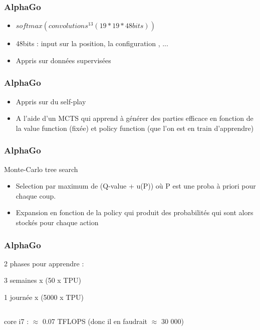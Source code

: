 \documentclass{formation}
\begin{document}
\begin{frame}
  \frametitle{AlphaGo}
  \begin{minipage}[c]{0.50\linewidth}
    \begin{itemize}
    \item $softmax(convolutions^{13}(19*19*48{bits}))$
    \item 48bits : input sur la position, la configuration , ...
    \item Appris sur données supervisées
    \end{itemize}
  \end{minipage}\hfill
  \begin{minipage}[c]{0.49\linewidth}
  \end{minipage}\hfill
\end{frame}

\begin{frame}
  \frametitle{AlphaGo}
  \begin{minipage}[c]{0.50\linewidth}
  \end{minipage}\hfill
  \begin{minipage}[c]{0.49\linewidth}
    \begin{itemize}
    \item Appris sur du self-play
    \item A l'aide d'un MCTS qui apprend à générer des parties efficace en fonction de la value function (fixée) et policy function (que l'on est en train d'apprendre)
    \end{itemize}
  \end{minipage}\hfill
\end{frame}

\begin{frame}
  \frametitle{AlphaGo}
  Monte-Carlo tree search
  \begin{itemize}
  \item Selection par maximum de (Q-value + u(P)) où P est une proba à priori pour chaque coup.
  \item Expansion en fonction de la policy qui produit des probabilités qui sont alors stockés pour chaque action
  \end{itemize}
\end{frame}

\begin{frame}
  \frametitle{AlphaGo}
  2 phases pour apprendre :
  \begin{description}
  \item[Value network  :]
  \item 3 semaines x (50 x TPU) 
  \item[1 million de parties APV-MCTS :]
  \item 1 journée x (5000 x TPU)
  \item $\;$
  \item[50 TPU $\approx$ 2000 TFLOPS]
  \item core i7 : $\approx$ 0.07 TFLOPS (donc il en faudrait $\approx$ 30 000)
  \end{description}
\end{frame}
\end{document}
